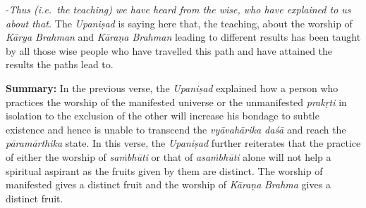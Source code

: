 -\emph{Thus (i.e.\ the teaching) we have heard from the wise, who have explained to us about that.} The \emph{Upaniṣad} is saying here that, the teaching, about the worship of \emph{Kārya Brahman} and \emph{Kāraṇa Brahman} leading to different results has been taught by all those wise people who have travelled this path and have attained the results the paths lead to.

\textbf{Summary:} In the previous verse, the \emph{Upaniṣad} explained how a person who practices the worship of the manifested universe or the unmanifested \emph{prakṛti} in isolation to the exclusion of the other will increase his bondage to subtle existence and hence is unable to transcend the \emph{vyāvahārika daśā} and reach the \emph{pāramārthika} state. In this verse, the \emph{Upaniṣad} further reiterates that the practice of either the worship of \emph{saṁbhūti} or that of \emph{asaṁbhūti} alone will not help a spiritual aspirant as the fruits given by them are distinct. The worship of manifested gives a distinct fruit and the worship of \emph{Kāraṇa} \emph{Brahma} gives a distinct fruit.


